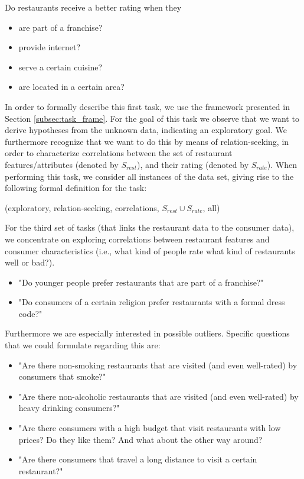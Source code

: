 Do restaurants receive a better rating when they
\begin{itemize}
\setlength{\itemsep}{0cm}%
\setlength{\parskip}{0cm}%
\item are part of a franchise?
\item provide internet?
\item serve a certain cuisine?
\item are located in a certain area?
\end{itemize}


In order to formally describe this first task, we use the framework presented in Section \ref{subsec:task_frame}. For the goal of this task we observe that we want to derive hypotheses from the unknown data, indicating an exploratory goal. We furthermore recognize that we want to do this by means of relation-seeking, in order to characterize correlations between the set of restaurant features/attributes (denoted by $S_{rest}$), and their rating (denoted by $S_{rate}$). When performing this task, we consider all instances of the data set, giving rise to the following formal definition for the task:

(exploratory, relation-seeking, correlations, $S_{rest} \cup S_{rate}$, all)

For the third set of tasks (that links the restaurant data to the consumer data), we concentrate on exploring correlations between restaurant features and consumer characteristics (i.e., what kind of people rate what kind of restaurants well or bad?).

\begin{itemize}
\setlength{\itemsep}{0cm}%
\setlength{\parskip}{0cm}%
\item "Do younger people prefer restaurants that are part of a franchise?"
\item "Do consumers of a certain religion prefer restaurants with a formal dress code?"
\end{itemize}

Furthermore we are especially interested in possible outliers. Specific questions that we could formulate regarding this are:
\begin{itemize}
\setlength{\itemsep}{0cm}%
\setlength{\parskip}{0cm}%
\item "Are there non-smoking restaurants that are visited (and even well-rated) by consumers that smoke?"
\item "Are there non-alcoholic restaurants that are visited (and even well-rated) by heavy drinking consumers?"
\item "Are there consumers with a high budget that visit restaurants with low prices? Do they like them? And what about the other way around?
\item "Are there consumers that travel a long distance to visit a certain restaurant?"
\end{itemize}

